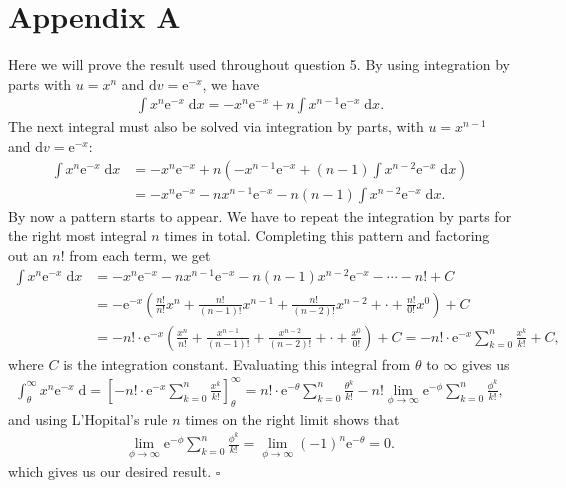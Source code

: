 \documentclass[10pt]{article}
\begin{document}
\section{Appendix A} \noindent
Here we will prove the result used throughout question 5. By using integration by parts with \(u = x^n\) and \(\mathrm{d}v = \mathrm{e}^{-x}\), we have 
\begin{align*}
    \int x^n \mathrm{e}^{-x} \;\mathrm{d}x = -x^n \mathrm{e}^{-x} + n \int x^{n-1} \mathrm{e}^{-x} \;\mathrm{d}x.
\end{align*}
The next integral must also be solved via integration by parts, with \(u = x^{n-1}\) and \(\mathrm{d}v = \mathrm{e}^{-x}\):
\begin{align*}
    \int x^n \mathrm{e}^{-x} \;\mathrm{d}x &= -x^n \mathrm{e}^{-x} + n \left( -x^{n-1} \mathrm{e}^{-x} + (n-1) \int x^{n-2} \mathrm{e}^{-x} \;\mathrm{d}x  \right) \\
    &= -x^n \mathrm{e}^{-x} -nx^{n-1} \mathrm{e}^{-x} - n(n-1) \int x^{n-2} \mathrm{e}^{-x} \;\mathrm{d}x.
\end{align*}
By now a pattern starts to appear. We have to repeat the integration by parts for the right most integral \(n\) times in total. 
Completing this pattern and factoring out an \(n!\) from each term, we get
\begin{align*}
    \int x^n \mathrm{e}^{-x} \;\mathrm{d}x &= -x^n \mathrm{e}^{-x} - nx^{n-1}\mathrm{e}^{-x} - n(n-1)x^{n-2}\mathrm{e}^{-x} - \cdots - n! + C\\
    &= -\mathrm{e}^{-x} \left( \frac{n!}{n!}x^{n} + \frac{n!}{(n-1)!}x^{n-1} + \frac{n!}{(n-2)!}x^{n-2} + \cdot + \frac{n!}{0!}x^0 \right) + C\\
    &= -n! \cdot \mathrm{e}^{-x} \left( \frac{x^n}{n!} + \frac{x^{n-1}}{(n-1)!} + \frac{x^{n-2}}{(n-2)!} + \cdot + \frac{x^0}{0!} \right) + C
    = -n! \cdot \mathrm{e}^{-x} \sum_{k=0}^n \frac{x^k}{k!} + C,
\end{align*}
where \(C\) is the integration constant. Evaluating this integral from \(\theta\) to \(\infty\) gives us 
\begin{align*}
    \int_{\theta}^{\infty} x^n \mathrm{e}^{-x} \;\mathrm{d} 
    = \left[ -n! \cdot \mathrm{e}^{-x} \sum_{k=0}^n \frac{x^k}{k!} \right]_{\theta}^{\infty}
    = n! \cdot \mathrm{e}^{-\theta} \sum_{k=0}^n \frac{\theta^k}{k!} - n! \lim_{\phi \to \infty} \mathrm{e}^{-\phi} \sum_{k=0}^n \frac{\phi^k}{k!},
\end{align*}
and using L'Hopital's rule \(n\) times on the right limit shows that 
\begin{align*}
    \lim_{\phi \to \infty} \mathrm{e}^{-\phi} \sum_{k=0}^n \frac{\phi^k}{k!} = \lim_{\phi \to \infty} (-1)^n \mathrm{e}^{-\theta} = 0.
\end{align*}
which gives us our desired result. \hfill \(\square\)
\end{document}
